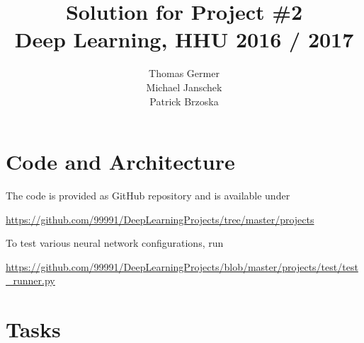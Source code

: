 \documentclass{article}
\title{Solution for Project \#2 \\\large Deep Learning, HHU 2016 / 2017 }
\author{
  Thomas Germer \\
  \And
  Michael Janschek \\
  \And
  Patrick Brzoska \\
}
\begin{document}
\maketitle

\section{Code and Architecture}

The code is provided as GitHub repository and is available under
\begin{center}
	\url{https://github.com/99991/DeepLearningProjects/tree/master/projects}
\end{center}

To test various neural network configurations, run
\begin{center}
	\url{https://github.com/99991/DeepLearningProjects/blob/master/projects/test/test_runner.py}
\end{center}

\newpage

\section{Tasks}
\end{document}
